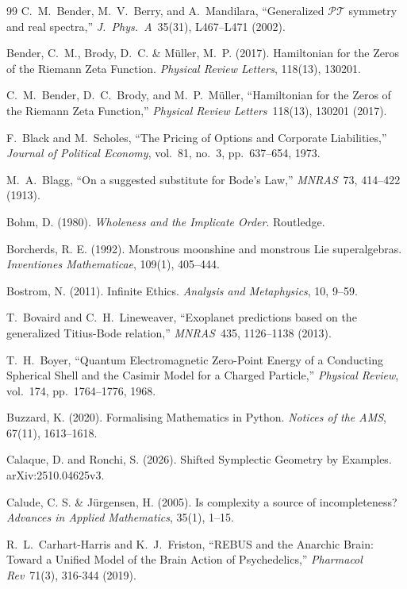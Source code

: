 \begin{thebibliography}{99}
 C.~M.~Bender, M.~V.~Berry, and A.~Mandilara, ``Generalized $\mathcal{PT}$ symmetry and real spectra,'' \emph{J.\ Phys.\ A}\ 35(31), L467--L471 (2002).

Bender, C.~M., Brody, D.~C. \& M\"uller, M.~P. (2017).
Hamiltonian for the Zeros of the Riemann Zeta Function.
\emph{Physical Review Letters}, 118(13), 130201.

 C.~M.~Bender, D.~C.~Brody, and M.~P.~M\"uller, ``Hamiltonian for the Zeros of the Riemann Zeta Function,'' \emph{Physical Review Letters}\ 118(13), 130201 (2017).

F.~Black and M.~Scholes,
``The Pricing of Options and Corporate Liabilities,''
\emph{Journal of Political Economy}, vol.~81, no.~3, pp.~637--654, 1973.

 M.~A.~Blagg, ``On a suggested substitute for Bode's Law,'' \emph{MNRAS}\ 73, 414--422 (1913).

 Bohm, D. (1980). \emph{Wholeness and the Implicate Order}. Routledge.

 Borcherds, R. E. (1992). Monstrous moonshine and monstrous Lie superalgebras. \emph{Inventiones Mathematicae}, 109(1), 405--444.

 Bostrom, N. (2011). Infinite Ethics. \emph{Analysis and Metaphysics}, 10, 9--59.

 T.~Bovaird and C.~H.~Lineweaver, ``Exoplanet predictions based on the generalized Titius-Bode relation,'' \emph{MNRAS}\ 435, 1126--1138 (2013).

T.~H.~Boyer,
``Quantum Electromagnetic Zero-Point Energy of a Conducting Spherical Shell and the Casimir Model for a Charged Particle,''
\emph{Physical Review}, vol.~174, pp.~1764--1776, 1968.

 Buzzard, K. (2020). Formalising Mathematics in Python. \emph{Notices of the AMS}, 67(11), 1613--1618.

 Calaque, D. and Ronchi, S. (2026). Shifted Symplectic Geometry by Examples. arXiv:2510.04625v3.

 Calude, C. S. \& J\"urgensen, H. (2005). Is complexity a source of incompleteness? \emph{Advances in Applied Mathematics}, 35(1), 1--15.

 R.~L.~Carhart-Harris and K.~J.~Friston, ``REBUS and the Anarchic Brain: Toward a Unified Model of the Brain Action of Psychedelics,'' \emph{Pharmacol Rev}\ 71(3), 316-344 (2019).


\end{thebibliography}

